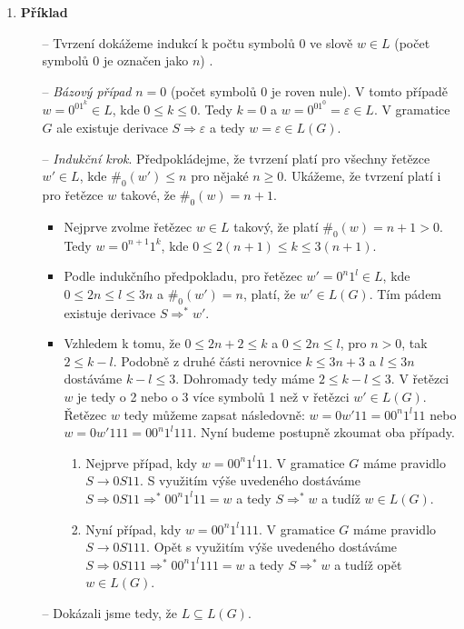 \documentclass[a4paper,12pt]{article}
\begin{document}
\begin{enumerate}[label=\textbf{\arabic*}.]
 
 \item {\bfseries Příklad}
    \begin{itemize}
     \item[--] Tvrzení dokážeme indukcí k počtu symbolů 0 ve slově $w \in L$ (počet symbolů 0 je označen jako $n$) .
     \item[--] {\it Bázový případ} $n = 0$ (počet symbolů 0 je roven nule). V tomto případě $w = 0^01^k \in L$, kde
      $0 \leq k \leq 0$. Tedy $k = 0$ a $w = 0^01^0 = \varepsilon \in L$. V gramatice $G$ ale existuje
      derivace $S \Rightarrow \varepsilon$ a tedy $w = \varepsilon \in L(G)$.
     \item[--] {\it Indukční krok}. Předpokládejme, že tvrzení platí pro všechny řetězce $w' \in L$, kde $\#_0(w')\leq n$
      pro nějaké $n\geq 0$. Ukážeme, že tvrzení platí i pro řetězce $w$ takové, že $\#_0(w) = n + 1$.
      \begin{itemize}
       \item Nejprve zvolme řetězec $w \in L$ takový, že platí $\#_0(w) = n + 1 > 0$. Tedy $w = 0^{n+1}1^k$, kde
      $0\leq 2(n+1) \leq k \leq 3(n+1)$. 
      
      \item Podle indukčního předpokladu, pro řetězec $w'= 0^n1^l \in L$, kde $0\leq 2n\leq l \leq 3n$
      a $\#_0(w') = n$, platí, že $w'\in L(G)$. Tím pádem existuje derivace $S \Rightarrow^* w'$. 
      
      \item Vzhledem k tomu, že $0 \leq 2n + 2 \leq k$ a $0 \leq 2n \leq l$, pro $n > 0$, tak $2 \leq k - l$.
      Podobně z druhé části nerovnice $k \leq 3n + 3$ a $l \leq 3n$ dostáváme $k - l \leq 3$. Dohromady tedy máme
      $2 \leq k-l \leq 3$. V řetězci $w$ je 
      tedy o 2 nebo o 3 více symbolů 1 než v řetězci $w' \in L(G)$. Řetězec $w$ tedy můžeme zapsat následovně:
      $w = 0w'11 = 00^n1^l11$ nebo $w = 0w'111 = 00^n1^l111$. Nyní budeme postupně zkoumat oba případy.
      \begin{enumerate}
       \item Nejprve případ, kdy $w = 00^n1^l11$. V gramatice $G$ máme pravidlo $S\rightarrow 0S11$. S využitím výše uvedeného
        dostáváme $S \Rightarrow 0S11 \Rightarrow^* 00^n1^l11 = w$ a tedy $S \Rightarrow^* w$ a tudíž $w \in L(G)$.
        
       \item Nyní případ, kdy $w = 00^n1^l111$. V gramatice $G$ máme pravidlo $S\rightarrow 0S111$. Opět s využitím výše uvedeného
        dostáváme $S \Rightarrow 0S111 \Rightarrow^* 00^n1^l111 = w$ a tedy $S \Rightarrow^* w$ a tudíž opět $w \in L(G)$.
      \end{enumerate}
      \end{itemize}
      \item [--] Dokázali jsme tedy, že $L\subseteq L(G)$.
    \end{itemize} 
    

\end{enumerate}
\end{document}
